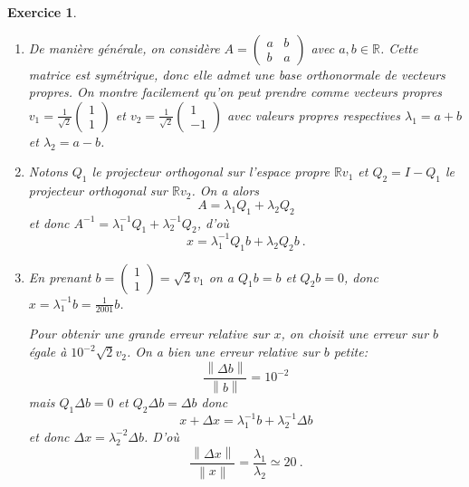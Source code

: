 \documentclass[10pt,a4paper]{article}
\newcommand{\R}{\mathbb R}
\newcommand{\norm}[1]{{\left\|{#1}\right\|}}
\newtheorem{exer}{Exercice}
\def\bexer{\begin{exer}\begin{em}}\def\eexer{\end{em}\end{exer}}
\def\1{{\rm 1\kern-.8ex 1}}
\begin{document}
\bexer 
\begin{enumerate}
\item De manière générale, on considère $A=\begin{pmatrix} a & b \\ b& a \end{pmatrix}$ avec $a, b\in \R$. Cette matrice est symétrique, donc elle admet une base orthonormale de vecteurs propres. On montre facilement qu'on peut prendre comme vecteurs propres $v_1=\frac{1}{\sqrt{2}}\begin{pmatrix} 1 \\ 1 \end{pmatrix}$ et $v_2=\frac{1}{\sqrt{2}}\begin{pmatrix} 1 \\ -1 \end{pmatrix}$ avec valeurs propres respectives $\lambda_1=a+b$ et $\lambda_2=a-b$.

\item Notons $Q_1$ le projecteur orthogonal sur l'espace propre $\R v_1$ et $Q_2=I-Q_1$ le projecteur orthogonal sur $\R v_2$. On a alors 
\[
A=\lambda_1 Q_1 +\lambda_2 Q_2
\]
et donc $A^{-1}=\lambda_1^{-1}Q_1+\lambda_2^{-1}Q_2$, d'où
\[
x=\lambda_1^{-1} Q_1 b+\lambda_2 Q_2 b~.
\]
\item En prenant $b=\begin{pmatrix} 1\\1 \end{pmatrix}=\sqrt{2}v_1$ on a $Q_1 b=b$ et $Q_2 b=0$, donc $x=\lambda_1^{-1} b=\frac{1}{2001} b$. 

Pour obtenir une grande erreur relative sur $x$, on choisit une erreur sur $b$ égale à $10^{-2} \sqrt{2} v_2$. On a bien une erreur relative sur $b$ petite:
\[
\frac{\norm{\Delta b}}{\norm{b}}=10^{-2}
\]
mais $Q_1\Delta b=0$ et $Q_2 \Delta b=\Delta b$ donc 
\[
x+\Delta x=\lambda_1^{-1} b+\lambda_2^{-1}\Delta b
\]
et donc $\Delta x =\lambda_2^{-2} \Delta b$. D'où
\[
\frac{\norm{\Delta x}}{\norm{x}}=\frac{\lambda_1}{\lambda_2}\simeq 20~.
\]
\end{enumerate}
\eexer

\vspace{.2cm}
\end{document}
